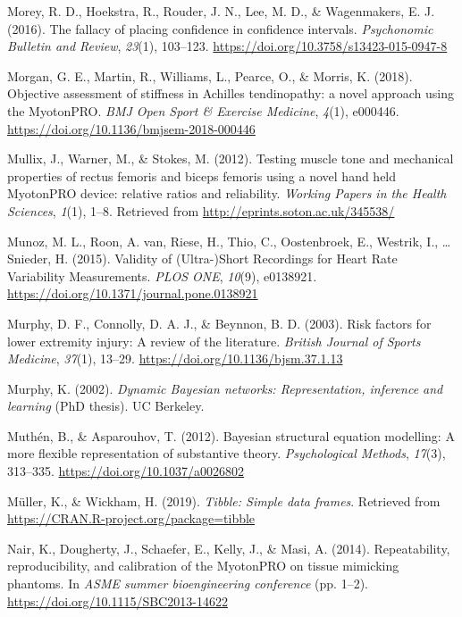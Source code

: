 \documentclass[man,floatsintext]{apa6}
\begin{document}
\leavevmode\hypertarget{ref-Morey2016}{}%
Morey, R. D., Hoekstra, R., Rouder, J. N., Lee, M. D., \& Wagenmakers, E. J. (2016). The fallacy of placing confidence in confidence intervals. \emph{Psychonomic Bulletin and Review}, \emph{23}(1), 103--123. \url{https://doi.org/10.3758/s13423-015-0947-8}

\leavevmode\hypertarget{ref-Morgan2018}{}%
Morgan, G. E., Martin, R., Williams, L., Pearce, O., \& Morris, K. (2018). Objective assessment of stiffness in Achilles tendinopathy: a novel approach using the MyotonPRO. \emph{BMJ Open Sport \& Exercise Medicine}, \emph{4}(1), e000446. \url{https://doi.org/10.1136/bmjsem-2018-000446}

\leavevmode\hypertarget{ref-Mullix2012}{}%
Mullix, J., Warner, M., \& Stokes, M. (2012). Testing muscle tone and mechanical properties of rectus femoris and biceps femoris using a novel hand held MyotonPRO device: relative ratios and reliability. \emph{Working Papers in the Health Sciences}, \emph{1}(1), 1--8. Retrieved from \url{http://eprints.soton.ac.uk/345538/}

\leavevmode\hypertarget{ref-Munoz2015}{}%
Munoz, M. L., Roon, A. van, Riese, H., Thio, C., Oostenbroek, E., Westrik, I., \ldots{} Snieder, H. (2015). Validity of (Ultra-)Short Recordings for Heart Rate Variability Measurements. \emph{PLOS ONE}, \emph{10}(9), e0138921. \url{https://doi.org/10.1371/journal.pone.0138921}

\leavevmode\hypertarget{ref-Murphy2003}{}%
Murphy, D. F., Connolly, D. A. J., \& Beynnon, B. D. (2003). Risk factors for lower extremity injury: A review of the literature. \emph{British Journal of Sports Medicine}, \emph{37}(1), 13--29. \url{https://doi.org/10.1136/bjsm.37.1.13}

\leavevmode\hypertarget{ref-Murphy2002}{}%
Murphy, K. (2002). \emph{Dynamic Bayesian networks: Representation, inference and learning} (PhD thesis). UC Berkeley.

\leavevmode\hypertarget{ref-Muthen2012}{}%
Muthén, B., \& Asparouhov, T. (2012). Bayesian structural equation modelling: A more flexible representation of substantive theory. \emph{Psychological Methods}, \emph{17}(3), 313--335. \url{https://doi.org/10.1037/a0026802}

\leavevmode\hypertarget{ref-R-tibble}{}%
Müller, K., \& Wickham, H. (2019). \emph{Tibble: Simple data frames}. Retrieved from \url{https://CRAN.R-project.org/package=tibble}

\leavevmode\hypertarget{ref-Nair2014}{}%
Nair, K., Dougherty, J., Schaefer, E., Kelly, J., \& Masi, A. (2014). Repeatability, reproducibility, and calibration of the MyotonPRO on tissue mimicking phantoms. In \emph{ASME summer bioengineering conference} (pp. 1--2). \url{https://doi.org/10.1115/SBC2013-14622}
\end{document}
